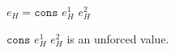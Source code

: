 \begin{case}

$e_{H}=\mathtt{cons}$ $e_{H}^{1}$ $e_{H}^{2}$

$\mathtt{cons}$ $e_{H}^{1}$ $e_{H}^{2}$ is an unforced value.

\end{case}